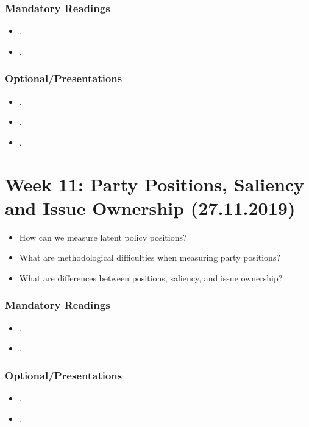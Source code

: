 \documentclass[abstract=on,parskip=full,headings=standardclasses,fontsize=11pt,paper=a4]{scrartcl}
\begin{document}
\subsubsection*{Mandatory Readings}
\begin{itemize}
\item {}.
\item {}. %
\end{itemize}

\subsubsection*{Optional/Presentations}
\begin{itemize}
\item {}.
\item {}.
\item {}.
\end{itemize}



\section{Week 11:   Party Positions, Saliency and Issue Ownership (27.11.2019)}


\begin{itemize}
\renewcommand\labelitemi{--}
\item How can we measure latent policy positions? 
\item What are methodological difficulties when measuring party positions?
\item What are differences between positions, saliency, and issue ownership?
\end{itemize}

\subsubsection*{Mandatory Readings}
\begin{itemize}
\item {}.
\item {}.
\end{itemize}


\subsubsection*{Optional/Presentations}
\begin{itemize}
\item {}.
\item {}.
\end{itemize}
\end{document}
